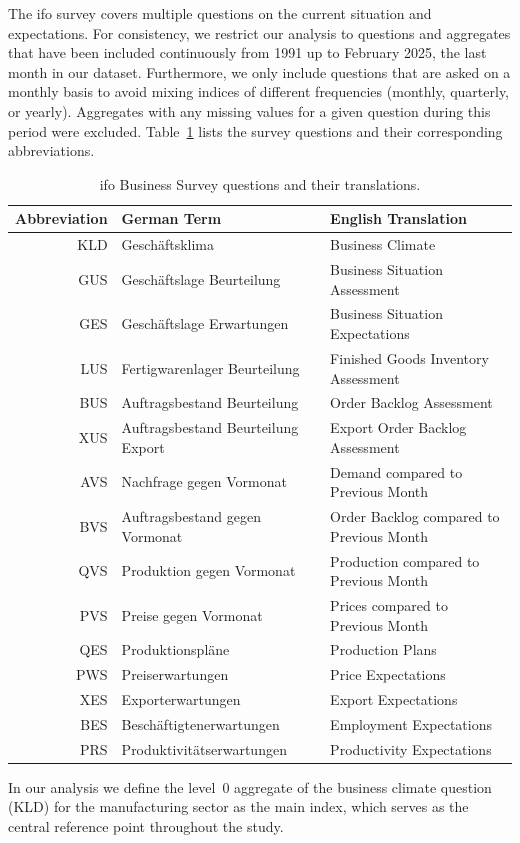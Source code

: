 The ifo survey covers multiple questions on the current situation and expectations. For consistency, we restrict our analysis to questions and aggregates that have been included continuously from 1991 up to February 2025, the last month in our dataset. Furthermore, we only include questions that are asked on a monthly basis to avoid mixing indices of different frequencies (monthly, quarterly, or yearly). Aggregates with any missing values for a given question during this period were excluded. Table~\ref{tab:ifo_terms} lists the survey questions and their corresponding abbreviations.

\begin{table}[H]
\small
\centering
\label{tab:ifo_terms}
\begin{tabularx}{\textwidth}{|r|l|X|}
\toprule
\textbf{Abbreviation} & \textbf{German Term} & \textbf{English Translation} \\
\midrule
KLD & Geschäftsklima & Business Climate \\
GUS & Geschäftslage Beurteilung & Business Situation Assessment \\
GES & Geschäftslage Erwartungen & Business Situation Expectations \\
LUS & Fertigwarenlager Beurteilung & Finished Goods Inventory Assessment \\
BUS & Auftragsbestand Beurteilung & Order Backlog Assessment \\
XUS & Auftragsbestand Beurteilung Export & Export Order Backlog Assessment \\
AVS & Nachfrage gegen Vormonat & Demand compared to Previous Month \\
BVS & Auftragsbestand gegen Vormonat & Order Backlog compared to Previous Month \\
QVS & Produktion gegen Vormonat & Production compared to Previous Month \\
PVS & Preise gegen Vormonat & Prices compared to Previous Month \\
QES & Produktionspläne & Production Plans \\
PWS & Preiserwartungen & Price Expectations \\
XES & Exporterwartungen & Export Expectations \\
BES & Beschäftigtenerwartungen & Employment Expectations \\
PRS & Produktivitätserwartungen & Productivity Expectations \\
\bottomrule
\end{tabularx}
\caption{ifo Business Survey questions and their translations.}
\label{tab:ifo_terms}
\end{table}

In our analysis we define the level~0 aggregate of the business climate question (KLD) for the manufacturing sector as the main index, which serves as the central reference point throughout the study.

